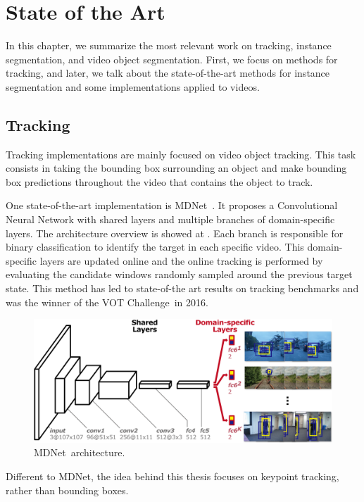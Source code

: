 
\chapter{State of the Art}
\label{cha:stateofart}

In this chapter, we summarize the most relevant work on tracking, instance segmentation, and video object segmentation.
First, we focus on methods for tracking, and later, we talk about the state-of-the-art methods for instance segmentation and some implementations applied to videos.

\section{Tracking}
\label{sec:soa_tracking}

Tracking implementations are mainly focused on video object tracking.
This task consists in taking the bounding box surrounding an object and make bounding box predictions throughout the video that contains the object to track.

One state-of-the-art implementation is MDNet~\mdnet.
It proposes a Convolutional Neural Network with shared layers and multiple branches of domain-specific layers.
The architecture overview is showed at .
Each branch is responsible for binary classification to identify the target in each specific video.
This domain-specific layers are updated online and the online tracking is performed by evaluating the candidate windows randomly sampled around the previous target state.
This method has led to state-of-the art results on tracking benchmarks and was the winner of the VOT Challenge~\votchallenge in 2016.

\begin{figure}[h]
  \centering
  \includegraphics[width=.8\linewidth]{figures/mdnet/architecture.png}
  \caption{MDNet~\mdnet architecture. }
  \label{fig:mdnet}
\end{figure}

Different to MDNet, the idea behind this thesis focuses on keypoint tracking, rather than bounding boxes.

